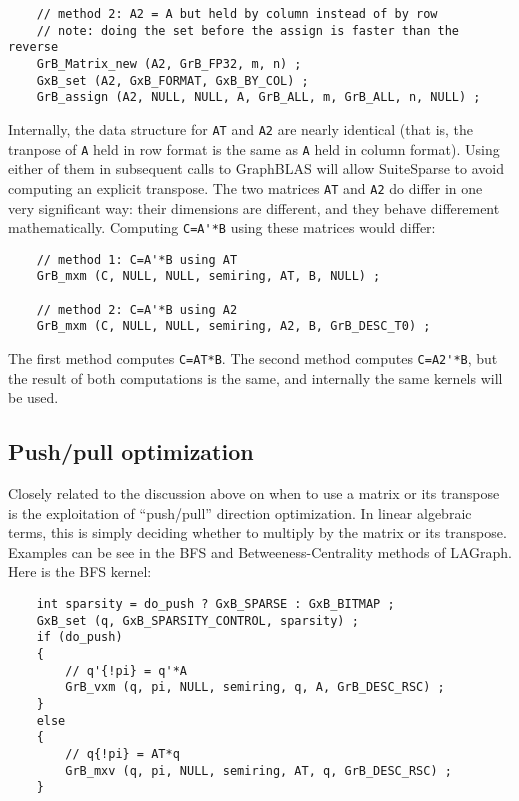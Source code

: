 \documentclass[12pt]{article}
\begin{document}
{{\begin{verbatim}
    // method 2: A2 = A but held by column instead of by row
    // note: doing the set before the assign is faster than the reverse
    GrB_Matrix_new (A2, GrB_FP32, m, n) ;
    GxB_set (A2, GxB_FORMAT, GxB_BY_COL) ;
    GrB_assign (A2, NULL, NULL, A, GrB_ALL, m, GrB_ALL, n, NULL) ; \end{verbatim}}

Internally, the data structure for \verb'AT' and \verb'A2' are nearly identical
(that is, the tranpose of \verb'A' held in row format is the same as \verb'A'
held in column format).  Using either of them in subsequent calls to GraphBLAS
will allow SuiteSparse to avoid computing an explicit transpose.  The two
matrices \verb'AT' and \verb'A2' do differ in one very significant way:  their
dimensions are different, and they behave differement mathematically.
Computing \verb"C=A'*B" using these matrices would differ:

    {\scriptsize
    \begin{verbatim}
    // method 1: C=A'*B using AT
    GrB_mxm (C, NULL, NULL, semiring, AT, B, NULL) ;

    // method 2: C=A'*B using A2
    GrB_mxm (C, NULL, NULL, semiring, A2, B, GrB_DESC_T0) ; \end{verbatim}}

The first method computes \verb'C=AT*B'.  The second method computes
\verb"C=A2'*B", but the result of both computations is the same, and internally
the same kernels will be used.

\subsection{Push/pull optimization}

Closely related to the discussion above on when to use a matrix or its
transpose is the exploitation of ``push/pull'' direction optimization.  In
linear algebraic terms, this is simply deciding whether to multiply by the
matrix or its transpose.  Examples can be see in the BFS and
Betweeness-Centrality methods of LAGraph.  Here is the BFS kernel:

    {\scriptsize
    \begin{verbatim}
    int sparsity = do_push ? GxB_SPARSE : GxB_BITMAP ;
    GxB_set (q, GxB_SPARSITY_CONTROL, sparsity) ;
    if (do_push)
    {
        // q'{!pi} = q'*A
        GrB_vxm (q, pi, NULL, semiring, q, A, GrB_DESC_RSC) ;
    }
    else
    {
        // q{!pi} = AT*q
        GrB_mxv (q, pi, NULL, semiring, AT, q, GrB_DESC_RSC) ;
    }\end{verbatim}}

}
\end{document}
